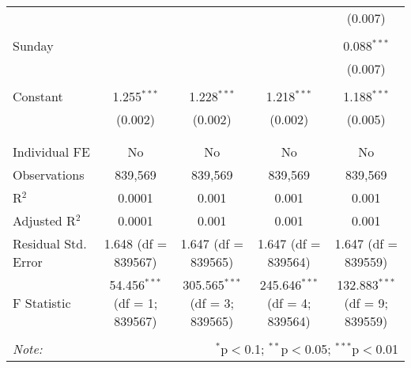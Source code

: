 \documentclass[
]{article}
\begin{document}
\begin{table}[!htbp]
{\begin{tabular}{@{\extracolsep{5pt}}lcccc}
  &  &  &  & (0.007) \\ 
  & & & & \\ 
 Sunday &  &  &  & 0.088$^{***}$ \\ 
  &  &  &  & (0.007) \\ 
  & & & & \\ 
 Constant & 1.255$^{***}$ & 1.228$^{***}$ & 1.218$^{***}$ & 1.188$^{***}$ \\ 
  & (0.002) & (0.002) & (0.002) & (0.005) \\ 
  & & & & \\ 
\hline \\[-1.8ex] 
Individual FE & No & No & No & No \\ 
Observations & 839,569 & 839,569 & 839,569 & 839,569 \\ 
R$^{2}$ & 0.0001 & 0.001 & 0.001 & 0.001 \\ 
Adjusted R$^{2}$ & 0.0001 & 0.001 & 0.001 & 0.001 \\ 
Residual Std. Error & 1.648 (df = 839567) & 1.647 (df = 839565) & 1.647 (df = 839564) & 1.647 (df = 839559) \\ 
F Statistic & 54.456$^{***}$ (df = 1; 839567) & 305.565$^{***}$ (df = 3; 839565) & 245.646$^{***}$ (df = 4; 839564) & 132.883$^{***}$ (df = 9; 839559) \\ 
\hline 
\hline \\[-1.8ex] 
\textit{Note:}  & \multicolumn{4}{r}{$^{*}$p$<$0.1; $^{**}$p$<$0.05; $^{***}$p$<$0.01} \\ 
\end{tabular}
} 
\end{table} 
\newpage
\end{document}
